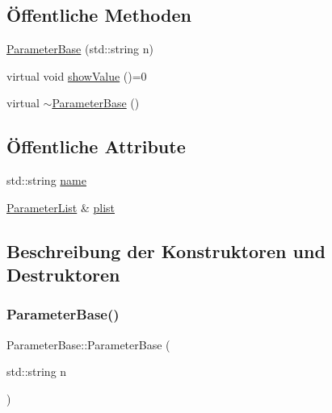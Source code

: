 \subsection*{Öffentliche Methoden}
\begin{DoxyCompactItemize}
\item 
\hyperlink{class_parameter_base_aead2d4fe464a5ff7116704fe7581cf66}{Parameter\+Base} (std\+::string n)
\item 
virtual void \hyperlink{class_parameter_base_ad09b4d79a05987d903a7d97e16649df7}{show\+Value} ()=0
\item 
virtual \hyperlink{class_parameter_base_a93ff8a33fbfb1aa468e0f303c6449983}{$\sim$\+Parameter\+Base} ()
\end{DoxyCompactItemize}
\subsection*{Öffentliche Attribute}
\begin{DoxyCompactItemize}
\item 
std\+::string \hyperlink{class_parameter_base_a3e2e2ad34b89eabb0484b3a338133614}{name}
\item 
\hyperlink{class_parameter_list}{Parameter\+List} \& \hyperlink{class_parameter_base_a5fabd899cfe1b654e5ff3e93145dd461}{plist}
\end{DoxyCompactItemize}


\subsection{Beschreibung der Konstruktoren und Destruktoren}
\hypertarget{class_parameter_base_aead2d4fe464a5ff7116704fe7581cf66}{}\label{class_parameter_base_aead2d4fe464a5ff7116704fe7581cf66} 
\subsubsection{\texorpdfstring{Parameter\+Base()}{ParameterBase()}}
{\footnotesize\ttfamily Parameter\+Base\+::\+Parameter\+Base (\begin{DoxyParamCaption}\item[{std\+::string}]{n }\end{DoxyParamCaption})}

\hypertarget{class_parameter_base_a93ff8a33fbfb1aa468e0f303c6449983}{}\label{class_parameter_base_a93ff8a33fbfb1aa468e0f303c6449983} 
